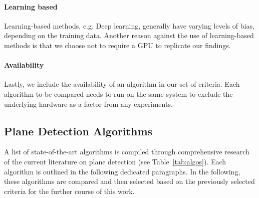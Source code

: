\documentclass[main.tex]{subfiles}
\begin{document}
\paragraph{Learning based}\label{subsec_learning_based}
Learning-based methods, e.g. Deep learning, generally have varying levels of bias, depending on the training data.
Another reason against the use of learning-based methods is that we choose not to require a GPU to replicate our findings.


\paragraph{Availability}
Lastly, we include the availability of an algorithm in our set of criteria.
Each algorithm to be compared needs to run on the same system to exclude the underlying hardware as a factor from any experiments.\\

\subsection{Plane Detection Algorithms}


A list of state-of-the-art algorithms is compiled through comprehensive research of the current literature on plane detection (see Table~\ref{tab:algos}).
Each algorithm is outlined in the following dedicated paragraphs. In the following, these algorithms are compared and then selected based on the previously selected criteria for the further course of this work.
\end{document}
